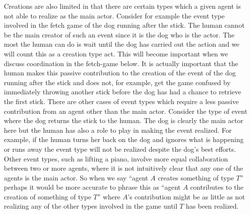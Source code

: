 Creations are also limited in
that there are certain types which a given agent is not able to
realize as the main actor.  Consider for example the event type involved in the fetch
game of the dog running after the stick.  The human cannot be the main
creator of such
an event since it is the dog who is the actor.  The most the human can
do is wait until the dog has carried out the action
and we will count this as a creation type act.  This will become
important when we discuss coordination in the fetch-game below.  It is
actually important that the human makes this passive contribution to
the creation of the event of the dog running after the stick and does
not, for example, get the game confused by immediately throwing
another stick before the dog has had a chance to retrieve the first
stick.  There are other cases of event types which require a less
passive contribution from an agent other than the main actor.
Consider the type of event where the dog returns the stick to the
human.  The dog is clearly the main actor here but the human has also
a role to play in making the event realized.  For example, if the
human turns her back on the dog and ignores what is happening or runs
away the event type will not be realized despite the dog's best
efforts.  Other event types, such as lifting a piano, involve more
equal collaboration between two or more agents, where it is not
intuitively clear that any one of the agents is the main actor.  So
when we say ``agent $A$ creates something of type $T$'' perhaps it
would be more accurate to phrase this as ``agent $A$ contributes to
the creation of something of type $T$'' where $A$'s contribution might
be as little as  not realizing any of the other types involved in the game until
$T$ has been realized.   
   
